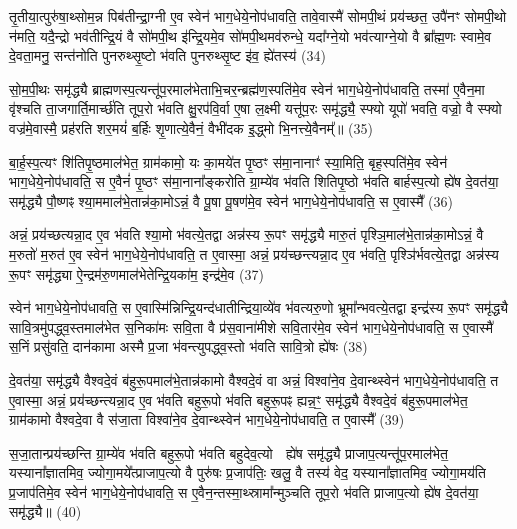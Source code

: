 तृ॒तीया॒त्पुरु॑षा॒थ्सोम॒न्न पिब॑तीन्द्रा॒ग्नी ए॒व स्वेन॑ भाग॒धेये॒नोप॑धावति॒ तावे॒वास्मै॑ सोमपी॒थं प्रय॑च्छत॒ उपै॑नꣳ सोमपी॒थो न॑मति॒ यदै॒न्द्रो भव॑तीन्द्रि॒यं वै सो॑मपी॒थ इ॑न्द्रि॒यमे॒व सो॑मपी॒थमव॑रुन्धे॒ यदा᳚ग्ने॒यो भव॑त्याग्ने॒यो वै ब्रा᳚ह्म॒णः स्वामे॒व दे॒वता॒मनु॒ सन्त॑नोति पुनरुथ्सृ॒ष्टो भ॑वति पुनरुथ्सृ॒ष्ट इ॑व॒ ह्ये॑तस्य॑ (34)

सो॒म॒पी॒थः समृ॑द्ध्यै ब्राह्मणस्प॒त्यन्तू॑प॒रमाल॑भेताभि॒चर॒न्ब्रह्म॑ण॒स्पति॑मे॒व स्वेन॑ भाग॒धेये॒नोप॑धावति॒ तस्मा॑ ए॒वैन॒मा वृ॑श्चति ता॒जगार्ति॒मार्च्छ॑ति तूप॒रो भ॑वति क्षु॒रप॑वि॒र्वा ए॒षा ल॒क्ष्मी यत्तू॑प॒रः समृ॑द्ध्यै॒ स्फ्यो यूपो॑ भवति॒ वज्रो॒ वै स्फ्यो वज्र॑मे॒वास्मै॒ प्रह॑रति शर॒मयं॑ ब॒र्\mbox{}हिः शृ॒णात्ये॒वैनं॒ वैभी॑दक इ॒द्ध्मो भि॒नत्त्ये॒वैनम्᳚॥ (35)

{}

बा॒र्\mbox{}ह॒स्प॒त्यꣳ शि॑तिपृ॒ष्ठमाल॑भेत॒ ग्राम॑कामो॒ यः का॒मये॑त पृ॒ष्ठꣳ स॑मा॒नानाꣳ॑ स्या॒मिति॒ बृह॒स्पति॑मे॒व स्वेन॑ भाग॒धेये॒नोप॑धावति॒ स ए॒वैनं॑ पृ॒ष्ठꣳ स॑मा॒नाना᳚ङ्करोति ग्रा॒म्ये॑व भ॑वति शितिपृ॒ष्ठो भ॑वति बार्\mbox{}हस्प॒त्यो ह्ये॑ष दे॒वत॑या॒ समृ॑द्ध्यै पौ॒ष्णꣴ श्या॒ममाल॑भे॒तान्न॑का॒मो\-ऽन्नं॒ वै पू॒षा पू॒षण॑मे॒व स्वेन॑ भाग॒धेये॒नोप॑धावति॒ स ए॒वास्मै᳚ (36)

अन्नं॒ प्रय॑च्छत्यन्ना॒द ए॒व भ॑वति श्या॒मो भ॑वत्ये॒तद्वा अन्न॑स्य रू॒पꣳ समृ॑द्ध्यै मारु॒तं पृश्ञि॒माल॑भे॒तान्न॑का॒मो\-ऽन्नं॒ वै म॒रुतो॑ म॒रुत॑ ए॒व स्वेन॑ भाग॒धेये॒नोप॑धावति॒ त ए॒वास्मा॒ अन्नं॒ प्रय॑च्छन्त्यन्ना॒द ए॒व भ॑वति॒ पृश्ञि॑र्भवत्ये॒तद्वा अन्न॑स्य रू॒पꣳ समृ॑द्ध्या ऐ॒न्द्रम॑रु॒णमाल॑भेतेन्द्रि॒यका॑म॒ इन्द्र॑मे॒व (37)

स्वेन॑ भाग॒धेये॒नोप॑धावति॒ स ए॒वास्मि॑न्निन्द्रि॒यन्द॑धातीन्द्रिया॒व्ये॑व भ॑वत्यरु॒णो भ्रूमा᳚न्भवत्ये॒तद्वा इन्द्र॑स्य रू॒पꣳ समृ॑द्ध्यै सावि॒त्रमु॑पद्ध्व॒स्तमाल॑भेत स॒निका॑मः सवि॒ता वै प्र॑स॒वाना॑मीशे सवि॒तार॑मे॒व स्वेन॑ भाग॒धेये॒नोप॑धावति॒ स ए॒वास्मै॑ स॒निं प्रसु॑वति॒ दान॑कामा अस्मै प्र॒जा भ॑वन्त्युपद्ध्व॒स्तो भ॑वति सावि॒त्रो ह्ये॑षः (38)

दे॒वत॑या॒ समृ॑द्ध्यै वैश्वदे॒वं ब॑हुरू॒पमाल॑भे॒तान्न॑कामो वैश्वदे॒वं वा अन्नं॒ विश्वा॑ने॒व दे॒वान्थ्स्वेन॑ भाग॒धेये॒नोप॑धावति॒ त ए॒वास्मा॒ अन्नं॒ प्रय॑च्छन्त्यन्ना॒द ए॒व भ॑वति बहुरू॒पो भ॑वति बहुरू॒पꣴ ह्यन्न॒ꣳ॒ समृ॑द्ध्यै वैश्वदे॒वं ब॑हुरू॒पमाल॑भेत॒ ग्राम॑कामो वैश्वदे॒वा वै स॑जा॒ता विश्वा॑ने॒व दे॒वान्थ्स्वेन॑ भाग॒धेये॒नोप॑धावति॒ त ए॒वास्मै᳚ (39)

स॒जा॒तान्प्रय॑च्छन्ति ग्रा॒म्ये॑व भ॑वति बहुरू॒पो भ॑वति बहुदेव॒त्यो  ह्ये॑ष समृ॑द्ध्यै प्राजाप॒त्यन्तू॑प॒रमाल॑भेत॒ यस्याना᳚ज्ञातमिव॒ ज्योगा॒मये᳚त्प्राजाप॒त्यो वै पुरु॑षः प्र॒जाप॑तिः॒ खलु॒ वै तस्य॑ वेद॒ यस्याना᳚ज्ञातमिव॒ ज्योगा॒मय॑ति प्र॒जाप॑तिमे॒व स्वेन॑ भाग॒धेये॒नोप॑धावति॒ स ए॒वैन॒न्तस्मा॒थ्स्रामा᳚न्मुञ्चति तूप॒रो भ॑वति प्राजाप॒त्यो ह्ये॑ष दे॒वत॑या॒ समृ॑द्ध्यै॥ (40)

